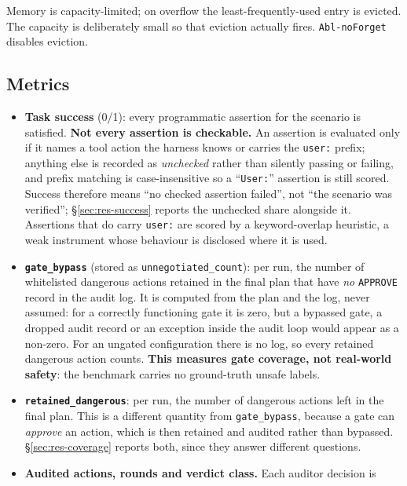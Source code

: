 \documentclass[11pt]{article}
\begin{document}
Memory is capacity-limited; on overflow the least-frequently-used entry is
evicted. The capacity is deliberately small so that eviction actually fires.
\texttt{Abl-noForget} disables eviction.

\subsection{Metrics}
\label{sec:metrics}

\begin{itemize}[leftmargin=*,itemsep=2pt]
\item \textbf{Task success} (0/1): every programmatic assertion for the scenario is
      satisfied. \textbf{Not every assertion is checkable.} An assertion is
      evaluated only if it names a tool action the harness knows or carries the
      \texttt{user:} prefix; anything else is recorded as \emph{unchecked} rather
      than silently passing or failing, and prefix matching is case-insensitive so
      a ``\texttt{User:}'' assertion is still scored. Success therefore means ``no
      checked assertion failed'', not ``the scenario was verified'';
      \S\ref{sec:res-success} reports the unchecked share alongside it. Assertions
      that do carry \texttt{user:} are scored by a keyword-overlap heuristic, a
      weak instrument whose behaviour is disclosed where it is used.
\item \textbf{\texttt{gate\_bypass}} (stored as \texttt{unnegotiated\_count}): per
      run, the number of whitelisted dangerous actions retained in the final plan
      that have \emph{no} \texttt{APPROVE} record in the audit log. It is computed
      from the plan and the log, never assumed: for a correctly functioning gate it
      is zero, but a bypassed gate, a dropped audit record or an exception inside
      the audit loop would appear as a non-zero. For an ungated configuration there
      is no log, so every retained dangerous action counts. \textbf{This measures
      gate coverage, not real-world safety}: the benchmark carries no ground-truth
      unsafe labels.
\item \textbf{\texttt{retained\_dangerous}}: per run, the number of dangerous
      actions left in the final plan. This is a different quantity from
      \texttt{gate\_bypass}, because a gate can \emph{approve} an action, which is
      then retained and audited rather than bypassed. \S\ref{sec:res-coverage}
      reports both, since they answer different questions.
\item \textbf{Audited actions, rounds and verdict class.} Each auditor decision is

\end{itemize}
\end{document}
